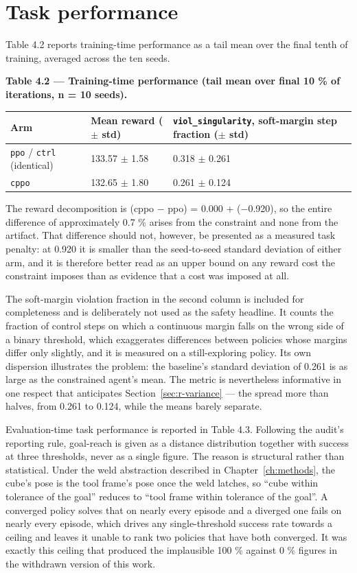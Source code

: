 
\section{Task performance}\label{sec:r-task}

Table 4.2 reports training-time performance as a tail mean over the final tenth of training,
averaged across the ten seeds.

\textbf{Table 4.2 --- Training-time performance (tail mean over final 10 \% of iterations, n = 10 seeds).}

\begin{longtable}[]{@{}lll@{}}
\toprule
Arm & Mean reward (\(\pm\) std) & \texttt{viol\_singularity}, soft-margin step fraction (\(\pm\) std)\tabularnewline
\midrule
\endhead
\texttt{ppo} / \texttt{ctrl} (identical) & 133.57 \(\pm\) 1.58 & 0.318 \(\pm\) 0.261\tabularnewline
\texttt{cppo} & 132.65 \(\pm\) 1.80 & 0.261 \(\pm\) 0.124\tabularnewline
\bottomrule
\end{longtable}

The reward decomposition is (cppo \(-\) ppo) = 0.000 + (\(-\)0.920), so the entire difference of
approximately 0.7 \% arises from the constraint and none from the artifact. That difference should
not, however, be presented as a measured task penalty: at 0.920 it is smaller than the
seed-to-seed standard deviation of either arm, and it is therefore better read as an upper bound
on any reward cost the constraint imposes than as evidence that a cost was imposed at all.

The soft-margin violation fraction in the second column is included for completeness and is
deliberately not used as the safety headline. It counts the fraction of control steps on which a
continuous margin falls on the wrong side of a binary threshold, which exaggerates differences
between policies whose margins differ only slightly, and it is measured on a still-exploring
policy. Its own dispersion illustrates the problem: the baseline's standard deviation of 0.261 is
as large as the constrained agent's mean. The metric is nevertheless informative in one respect
that anticipates Section~\ref{sec:r-variance} --- the spread more than halves, from 0.261 to 0.124, while the means
barely separate.

Evaluation-time task performance is reported in Table 4.3. Following the audit's reporting rule,
goal-reach is given as a distance distribution together with success at three thresholds, never as
a single figure. The reason is structural rather than statistical. Under the weld abstraction
described in Chapter~\ref{ch:methods}, the cube's pose is the tool frame's pose once the weld latches, so
``cube within tolerance of the goal'' reduces to ``tool frame within tolerance of the goal''. A
converged policy solves that on nearly every episode and a diverged one fails on nearly every
episode, which drives any single-threshold success rate towards a ceiling and leaves it unable to
rank two policies that have both converged. It was exactly this ceiling that produced the
implausible 100 \% against 0 \% figures in the withdrawn version of this work.

